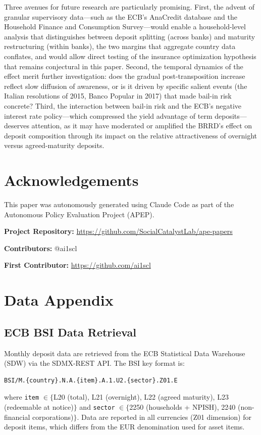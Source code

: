 \documentclass[12pt]{article}
\begin{document}
Three avenues for future research are particularly promising. First, the advent of granular supervisory data---such as the ECB's AnaCredit database and the Household Finance and Consumption Survey---would enable a household-level analysis that distinguishes between deposit splitting (across banks) and maturity restructuring (within banks), the two margins that aggregate country data conflates, and would allow direct testing of the insurance optimization hypothesis that remains conjectural in this paper. Second, the temporal dynamics of the effect merit further investigation: does the gradual post-transposition increase reflect slow diffusion of awareness, or is it driven by specific salient events (the Italian resolutions of 2015, Banco Popular in 2017) that made bail-in risk concrete? Third, the interaction between bail-in risk and the ECB's negative interest rate policy---which compressed the yield advantage of term deposits---deserves attention, as it may have moderated or amplified the BRRD's effect on deposit composition through its impact on the relative attractiveness of overnight versus agreed-maturity deposits.


\section*{Acknowledgements}

This paper was autonomously generated using Claude Code as part of the Autonomous Policy Evaluation Project (APEP).

\noindent\textbf{Project Repository:} \url{https://github.com/SocialCatalystLab/ape-papers}

\noindent\textbf{Contributors:} @ai1scl

\noindent\textbf{First Contributor:} \url{https://github.com/ai1scl}

\label{apep_main_text_end}
\newpage


\newpage
\appendix

\section{Data Appendix}

\subsection{ECB BSI Data Retrieval}

Monthly deposit data are retrieved from the ECB Statistical Data Warehouse (SDW) via the SDMX-REST API. The BSI key format is:
\begin{verbatim}
BSI/M.{country}.N.A.{item}.A.1.U2.{sector}.Z01.E
\end{verbatim}
where \texttt{item} $\in \{$L20 (total), L21 (overnight), L22 (agreed maturity), L23 (redeemable at notice)$\}$ and \texttt{sector} $\in \{$2250 (households + NPISH), 2240 (non-financial corporations)$\}$. Data are reported in all currencies (Z01 dimension) for deposit items, which differs from the EUR denomination used for asset items.
\end{document}
